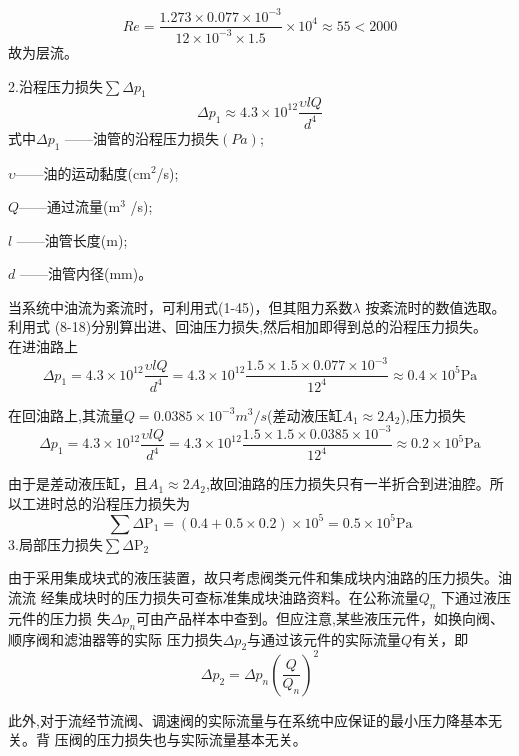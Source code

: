 $$
Re=\frac{1.273\times 0.077 \times 10^{-3}}{12\times10^{-3}\times 1.5}\times 10^4\approx55<2000
$$
故为层流。

2.沿程压力损失$\sum \Delta p_1$\\
\begin{equation}
\Delta p_1\approx 4.3\times10^{12} \frac{\upsilon l Q}{d^4}
\end{equation}
式中\quad $\Delta p_1$ ——油管的沿程压力损失$(Pa)$;

\quad\quad$\upsilon $——油的运动黏度(cm$^2$/s);

\quad\quad$Q$——通过流量(m$^3$ /s);

\quad\quad$l$ ——油管长度(m);

\quad\quad$d$ ——油管内径(mm)。

当系统中油流为紊流时，可利用式(1-45)，但其阻力系数$\lambda$ 按紊流时的数值选取。利用式
(8-18)分别算出进、回油压力损失,然后相加即得到总的沿程压力损失。\\
在进油路上
$$
\Delta p_1= 4.3\times10^{12} \frac{\upsilon l Q}{d^4}=4.3\times 10^{12} \frac {1.5\times 1.5 \times 0.077 \times 10^{-3}}{12^4} \approx 0.4\times 10^5 \text{Pa}
$$

在回油路上,其流量$Q=0.0385\times 10^{-3}m^3/s$(差动液压缸$A_1\approx 2A_2$),压力损失
$$\Delta p_1= 4.3\times10^{12} \frac{\upsilon l Q}{d^4}=4.3\times 10^{12} \frac {1.5\times 1.5 \times 0.0385 \times 10^{-3}}{12^4} \approx 0.2\times 10^5 \text{Pa}$$

由于是差动液压缸，且$A_1\approx 2A_2$,故回油路的压力损失只有一半折合到进油腔。所以工进时总的沿程压力损失为
$$
\sum \Delta \text{P}_1=(0.4+0.5\times 0.2)\times 10^5=0.5\times 10^5\text{Pa}
$$
3.局部压力损失$\sum \Delta \text {P}_2$

由于采用集成块式的液压装置，故只考虑阀类元件和集成块内油路的压力损失。油流流
经集成块时的压力损失可查标准集成块油路资料。在公称流量$Q_n$   下通过液压元件的压力损
失$\Delta p_n$可由产品样本中查到。但应注意,某些液压元件，如换向阀、顺序阀和滤油器等的实际
压力损失$\Delta p_2$与通过该元件的实际流量$Q$有关，即
\begin{equation}
\Delta p_{2} =\Delta p_n(\frac{Q}{Q_n})^2
\end{equation}

此外,对于流经节流阀、调速阀的实际流量与在系统中应保证的最小压力降基本无关。背
压阀的压力损失也与实际流量基本无关。
